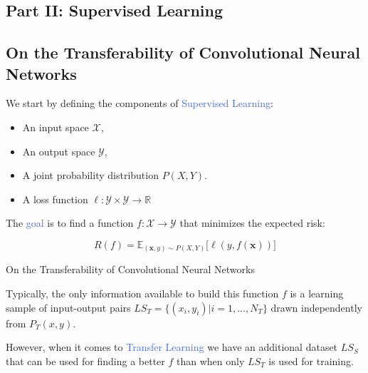 \documentclass{beamer}
\renewcommand{\vec}[1]{\mathbf{#1}
}
\begin{document}
\begin{frame}
	\section{Part II: Supervised Learning}
	\subsection{On the Transferability of Convolutional Neural Networks}

	We start by defining the components of \textcolor{RoyalBlue}{Supervised Learning}:

	\begin{itemize}
		\item An input space $\mathcal{X}$,
		\item An output space $\mathcal{Y}$,
		\item A joint probability distribution $P(X,Y)$.
		\item A loss function $\ell: \mathcal{Y} \times \mathcal{Y} \rightarrow \mathds{R}$
	\end{itemize}

	\bigskip

	The \textcolor{RoyalBlue}{goal} is to find a function $f:\mathcal{X}\rightarrow\mathcal{Y}$ that minimizes the expected risk:

	\begin{equation*}
		R(f) = \mathds{E}_{(\vec{x},y)\sim P(X,Y)} \big[\ell(y,f(\vec{x}))\big]
	\end{equation*}
\end{frame}

\begin{frame}{On the Transferability of Convolutional Neural Networks}

	Typically, the only information available to build this function $f$ is a learning sample of input-output pairs $LS_T=\{(x_i,y_i)|i=1,\ldots,N_T\}$ drawn independently from $P_T(x,y)$.

	\bigskip

	However, when it comes to \textcolor{RoyalBlue}{Transfer Learning} we have an additional dataset $LS_S$ that can be used for finding a better $f$ than when only $LS_T$ is used for training. 

\end{frame}
\end{document}
